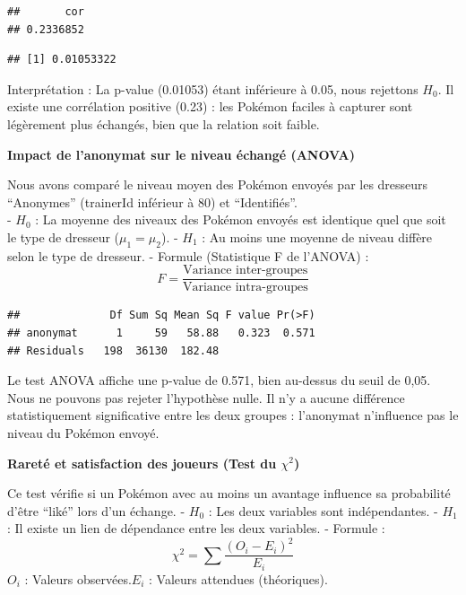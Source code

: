 \documentclass[mstat,12pt]{unswthesis}
\begin{document}
\begin{verbatim}
##       cor 
## 0.2336852
\end{verbatim}

\begin{verbatim}
## [1] 0.01053322
\end{verbatim}

\bigskip

Interprétation : La p-value (0.01053) étant inférieure à 0.05, nous
rejettons \(H_0\). Il existe une corrélation positive (0.23) : les
Pokémon faciles à capturer sont légèrement plus échangés, bien que la
relation soit faible.

\bigskip

\textbf{Impact de l'anonymat sur le niveau échangé (ANOVA)}

\bigskip

Nous avons comparé le niveau moyen des Pokémon envoyés par les dresseurs
``Anonymes'' (trainerId inférieur à 80) et ``Identifiés''.\\
- \(H_0\) : La moyenne des niveaux des Pokémon envoyés est identique
quel que soit le type de dresseur (\(\mu_1 = \mu_2\)). - \(H_1\) : Au
moins une moyenne de niveau diffère selon le type de dresseur. - Formule
(Statistique F de l'ANOVA)
:\[F = \frac{\text{Variance inter-groupes}}{\text{Variance intra-groupes}}\]

\bigskip

\begin{verbatim}
##              Df Sum Sq Mean Sq F value Pr(>F)
## anonymat      1     59   58.88   0.323  0.571
## Residuals   198  36130  182.48
\end{verbatim}

\bigskip

Le test ANOVA affiche une p-value de 0.571, bien au-dessus du seuil de
0,05. Nous ne pouvons pas rejeter l'hypothèse nulle. Il n'y a aucune
différence statistiquement significative entre les deux groupes :
l'anonymat n'influence pas le niveau du Pokémon envoyé.

\bigskip

\textbf{Rareté et satisfaction des joueurs (Test du \(\chi^2\))}

\bigskip

Ce test vérifie si un Pokémon avec au moins un avantage influence sa
probabilité d'être ``liké'' lors d'un échange. - \(H_0\) : Les deux
variables sont indépendantes. - \(H_1\) : Il existe un lien de
dépendance entre les deux variables. - Formule
:\[\chi^2 = \sum \frac{(O_i - E_i)^2}{E_i}\]\(O_i\) : Valeurs
observées.\(E_i\) : Valeurs attendues (théoriques).
\end{document}
